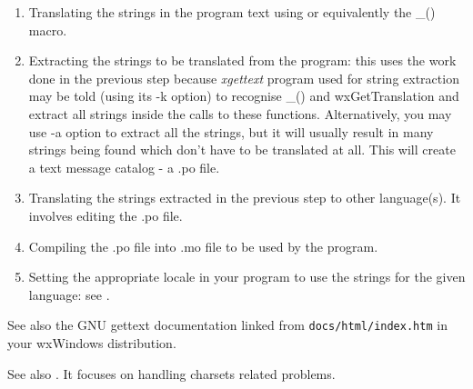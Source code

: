 \begin{enumerate}\itemsep=0pt
\item Translating the strings in the program text using 
 or equivalently the \_() macro.
\item Extracting the strings to be translated from the program: this uses the
work done in the previous step because {\it xgettext} program used for string
extraction may be told (using its -k option) to recognise \_() and
wxGetTranslation and extract all strings inside the calls to these functions.
Alternatively, you may use -a option to extract all the strings, but it will
usually result in many strings being found which don't have to be translated at
all. This will create a text message catalog - a .po file.
\item Translating the strings extracted in the previous step to other
language(s). It involves editing the .po file.
\item Compiling the .po file into .mo file to be used by the program.
\item Setting the appropriate locale in your program to use the strings for the
given language: see .
\end{enumerate}

See also the GNU gettext documentation linked from {\tt docs/html/index.htm} in
your wxWindows distribution.

See also .
It focuses on handling charsets related problems.

